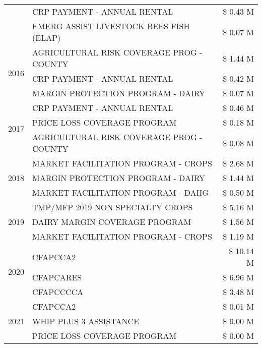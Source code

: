 \begin{tabular}{llr}
 & CRP PAYMENT - ANNUAL RENTAL & \$ 0.43 M \\
 & EMERG ASSIST LIVESTOCK BEES FISH (ELAP) & \$ 0.07 M \\
\cline{1-3}
\multirow[t]{3}{*}{2016} & AGRICULTURAL RISK COVERAGE PROG - COUNTY & \$ 1.44 M \\
 & CRP PAYMENT - ANNUAL RENTAL & \$ 0.42 M \\
 & MARGIN PROTECTION PROGRAM - DAIRY & \$ 0.07 M \\
\cline{1-3}
\multirow[t]{3}{*}{2017} & CRP PAYMENT - ANNUAL RENTAL & \$ 0.46 M \\
 & PRICE LOSS COVERAGE PROGRAM & \$ 0.18 M \\
 & AGRICULTURAL RISK COVERAGE PROG - COUNTY & \$ 0.08 M \\
\cline{1-3}
\multirow[t]{3}{*}{2018} & MARKET FACILITATION PROGRAM - CROPS & \$ 2.68 M \\
 & MARGIN PROTECTION PROGRAM - DAIRY & \$ 1.44 M \\
 & MARKET FACILITATION PROGRAM - DAHG & \$ 0.50 M \\
\cline{1-3}
\multirow[t]{3}{*}{2019} & TMP/MFP 2019 NON SPECIALTY CROPS & \$ 5.16 M \\
 & DAIRY MARGIN COVERAGE PROGRAM & \$ 1.56 M \\
 & MARKET FACILITATION PROGRAM - CROPS & \$ 1.19 M \\
\cline{1-3}
\multirow[t]{3}{*}{2020} & CFAPCCA2 & \$ 10.14 M \\
 & CFAPCARES & \$ 6.96 M \\
 & CFAPCCCCA & \$ 3.48 M \\
\cline{1-3}
\multirow[t]{3}{*}{2021} & CFAPCCA2 & \$ 0.01 M \\
 & WHIP PLUS 3 ASSISTANCE & \$ 0.00 M \\
 & PRICE LOSS COVERAGE PROGRAM & \$ 0.00 M \\
\cline{1-3}
\bottomrule
\end{tabular}
